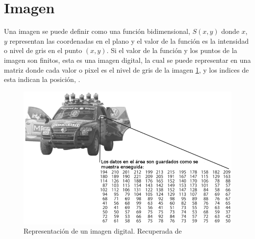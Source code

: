 
\section{Imagen}\label{ImagenDef} 

Una imagen se puede definir como una función bidimensional, $S(x,y)$ donde $x$, $y$ representan las coordenadas en el plano y el valor de la función es la intensidad o nivel de gris en el punto $(x,y)$. 
Si el valor de la función y los puntos de la imagen son finitos, esta es una imagen digital, la cual se puede representar en una matriz donde cada valor o pixel es el nivel de gris de la imagen \ref{fig:image}, y los indices de esta indican la posición, \citep{Gonzalez2002}. 

\begin{figure}[h!]
\begin{center}
\includegraphics[scale=.50]{./Figures/image.png}
\end{center}
\caption{Representación de un imagen digital. Recuperada de \citep{Shin2013}}
\label{fig:image}
\end{figure}








